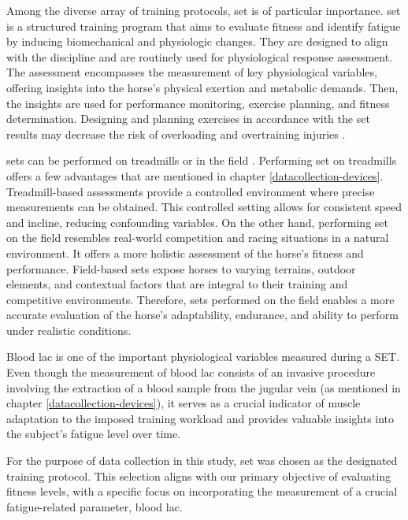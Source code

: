 Among the diverse array of training protocols, \gls{set} is of particular importance. \gls{set} is a structured training program that aims to evaluate fitness and identify fatigue by inducing biomechanical and physiologic changes. They are designed to align with the discipline and are routinely used for physiological response assessment. The assessment encompasses the measurement of key physiological variables, offering insights into the horse's physical exertion and metabolic demands. Then, the insights are used for performance monitoring, exercise planning, and fitness determination. Designing and planning exercises in accordance with the \gls{set} results may decrease the risk of overloading and overtraining injuries \cite{graaf232}.

\gls{set}s can be performed on treadmills or in the field \cite{munsters_2014_exercise}. Performing \gls{set} on treadmills offers a few advantages that are mentioned in chapter \ref{datacollection-devices}. Treadmill-based assessments provide a controlled environment where precise measurements can be obtained. This controlled setting allows for consistent speed and incline, reducing confounding variables. On the other hand, performing \gls{set} on the field resembles real-world competition and racing situations in a natural environment. It offers a more holistic assessment of the horse's fitness and performance. Field-based \gls{set}s expose horses to varying terrains, outdoor elements, and contextual factors that are integral to their training and competitive environments. Therefore, \gls{set}s performed on the field enables a more accurate evaluation of the horse's adaptability, endurance, and ability to perform under realistic conditions.

Blood \gls{lac} is one of the important physiological variables measured during a SET. Even though the measurement of blood \gls{lac} consists of an invasive procedure involving the extraction of a blood sample from the jugular vein (as mentioned in chapter \ref{datacollection-devices}), it serves as a crucial indicator of muscle adaptation to the imposed training workload and provides valuable insights into the subject's fatigue level over time.

For the purpose of data collection in this study, \gls{set} was chosen as the designated training protocol. This selection aligns with our primary objective of evaluating fitness levels, with a specific focus on incorporating the measurement of a crucial fatigue-related parameter, blood \gls{lac}. 

